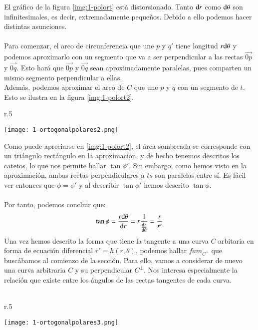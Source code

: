 El gráfico de la figura \ref{img:1-polort} está distorsionado. Tanto $\mathrm{d} r$ como $\mathrm{d} \theta$ son infinitesimales, es decir, extremadamente pequeños. Debido a ello podemos hacer distintas asunciones.\\\\
Para comenzar, el arco de circunferencia que une $p$ y $q'$ tiene longitud $r\mathrm{d} \theta$ y podemos aproximarlo con un segmento que va a ser perpendicular a las rectas $\vec{0p}$ y $\vec{0q}$. Esto hará que $\vec{0p}$ y $\vec{0q}$ sean aproximadamente paralelas, pues comparten un mismo segmento perpendicular a ellas.\\ Además, podemos aproximar el arco de $C$ que une $p$ y $q$ con un segmento de $t$. Esto se ilustra en la figura \ref{img:1-polort2}.

\begin{wrapfigure}{r}{.5\textwidth}
  \begin{center}
    \texttt{[image: 1-ortogonalpolares2.png]}
  \end{center}
  \caption{Aproximación por infinitesimales}\label{img:1-polort2}
\end{wrapfigure}

Como puede apreciarse en \ref{img:1-polort2}, el área sombreada se corresponde con un triángulo rectángulo en la aproximación, y de hecho tenemos descritos los catetos, lo que nos permite hallar $\tan\phi'$. Sin embargo, como hemos visto en la aproximación, ambas rectas perpendiculares a $ts$ son paralelas entre sí. Es fácil ver entonces que $\phi = \phi'$ y al describir $\tan\phi'$ hemos descrito $\tan\phi$.\\\\
Por tanto, podemos concluir que:
$$
\tan\phi = \frac{r\mathrm{d} \theta}{\mathrm{d} r} = r \frac{1}{\frac{\mathrm{d}r}{\mathrm{d}\theta}} = \frac{r}{r'}
$$
Una vez hemos descrito la forma que tiene la tangente a una curva $C$ arbitaria en forma de ecuación diferencial $r' = h(r,\theta)$, podemos hallar $fam_{C^\perp}$ que buscábamos al comienzo de la sección. Para ello, vamos a considerar de nuevo una curva arbitraria $C$ y su perpendicular $C^\perp$. Nos interesa especialmente la relación que existe entre los ángulos de las rectas tangentes de cada curva.\\\\
\begin{wrapfigure}{r}{.5\textwidth}
  \begin{center}
    \texttt{[image: 1-ortogonalpolares3.png]}
  \end{center}
  \caption{Angulos entre curvas ortogonales}\label{img:1-polort3}
\end{wrapfigure}

